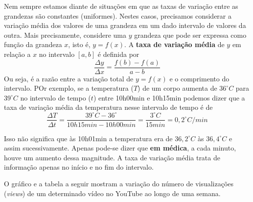 Nem sempre estamos diante de situações em que as taxas de variação entre as grandezas são constantes (uniformes). Nestes casos, precisamos considerar a variação média dos valores de uma grandeza em um dado intervalo de valores da outra. Mais precisamente, considere uma $y$ grandeza  que pode ser expressa como função da grandeza $x$, isto é, $y=f(x)$. A \textbf{taxa de variação média} de $y$ em relação a $x$ no intervalo $[a,b]$ é definida por
\begin{equation*}
\frac{\Delta y}{\Delta x}=\frac{f(b)-f(a)}{a-b}
\end{equation*}
Ou seja, é a razão entre a variação total de $y=f(x)$ e o comprimento do intervalo. POr exemplo, se a temperatura ($T$) de um corpo aumenta de $36^{\circ}C$ para $39^{\circ}C$ no intervalo de tempo ($t$) entre 10h00min e 10h15min podemos dizer que a taxa de variação média da temperatura nesse intervalo de tempo é de
\begin{equation*}
\frac{\Delta T}{\Delta t}=\frac{39^{\circ}C-36^{\circ}}{10h15min-10h00min}=\frac{3^{\circ}C}{15 min}=0,2^{\circ}C/min
\end{equation*}

Isso não significa que às 10h01min a temperatura era de $36,2^{\circ}C$ às $36,4^{\circ}C$ e assim sucessivamente. Apenas pode-se dizer que \textbf{em médica}, a cada minuto, houve um aumento dessa magnitude. A taxa de variação média trata de informação apenas no início e no fim do intervalo.

O gráfico e a tabela a seguir mostram a variação do número de visualizações (\textit{views}) de um determinado vídeo no YouTube ao longo de uma semana.

